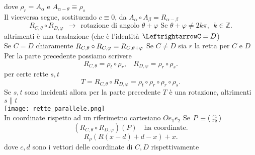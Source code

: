 \documentclass[12px]{article}
\begin{document}
	dove $\rho_r = A_\alpha$ e $A_{\alpha - \theta} \equiv \rho_s$
\\
Il viceversa segue, sostituendo $c\equiv 0$, da $A_\alpha\circ A_\beta = R_{\alpha - \beta}$
 \[
	 R_{C,\theta}\circ R_{D,\varphi} \ \ \rightarrow \ \ \text{rotazione di angolo } \theta + \varphi \text{ Se } \theta + \varphi\neq 2k\pi,\ \ k\in \mathbb{Z}
.\] 
altrimenti è una traslazione (che è l'identità $ \LeftrightarrowC = D$)\\
Se $C = D$ chiaramente $R_{C,\theta}\circ R_{C, \varphi} = R_{C,\theta + \varphi}\\$
Se $C \neq D$ sia $r$ la retta per $C$ e $D$ Per la parte precedente possiamo scrivere
\[
	R_{C,\theta} = \rho_t\circ\rho_r, \ \ \ \ R_{D,\varphi} = \rho_r\circ\rho_s
.\] 
per certe rette $s,t$ 
\[
	T = R_{C,\theta}\circ R_{D,\varphi} = \rho_t\circ\rho_r\circ\rho_r\circ\rho_s
.\] 
Se $s,t$ sono incidenti allora per la parte precedente $T$ è una rotazione, altrimenti $s\parallel t$\\
\texttt{[image: rette\_parallele.png]}\\
In coordinate rispetto ad un riferimetno cartesiano $Oe_1e_2$ Se $P\equiv\left(\begin{smallmatrix}x_1\\x_2\end{smallmatrix}\right)$ 
\[
	(R_{C,\theta}\circ R_{D,\varphi})(P) \ \ \ \text{ ha coordinate}
.\] 
\[
	R_\rho(R(x-d) + d-x) + x  
.\]
dove $c,d$ sono i vettori delle coordinate di $C,D $ rispettivamente\\
\end{document}
